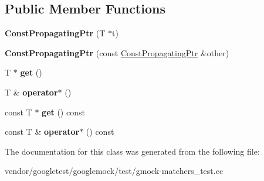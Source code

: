 \subsection*{Public Member Functions}
\begin{DoxyCompactItemize}
\item 
\mbox{\label{classtesting_1_1gmock__matchers__test_1_1_const_propagating_ptr_a06da70663daa274fb8ca3352f039d609}} 
{\bfseries Const\+Propagating\+Ptr} (T $\ast$t)
\item 
\mbox{\label{classtesting_1_1gmock__matchers__test_1_1_const_propagating_ptr_ae7620c62ba340603968896d5d5400ed1}} 
{\bfseries Const\+Propagating\+Ptr} (const \mbox{\hyperlink{classtesting_1_1gmock__matchers__test_1_1_const_propagating_ptr}{Const\+Propagating\+Ptr}} \&other)
\item 
\mbox{\label{classtesting_1_1gmock__matchers__test_1_1_const_propagating_ptr_a39a09d46453380ec1b8be8ce40adc453}} 
T $\ast$ {\bfseries get} ()
\item 
\mbox{\label{classtesting_1_1gmock__matchers__test_1_1_const_propagating_ptr_ad77bbeaa18f84cbd6f3dc7021904f1e3}} 
T \& {\bfseries operator$\ast$} ()
\item 
\mbox{\label{classtesting_1_1gmock__matchers__test_1_1_const_propagating_ptr_a92d7c8429246ef33a020e8a3d840b9c3}} 
const T $\ast$ {\bfseries get} () const
\item 
\mbox{\label{classtesting_1_1gmock__matchers__test_1_1_const_propagating_ptr_aad99a528754294ab397378034686ae3a}} 
const T \& {\bfseries operator$\ast$} () const
\end{DoxyCompactItemize}


The documentation for this class was generated from the following file\+:\begin{DoxyCompactItemize}
\item 
vendor/googletest/googlemock/test/gmock-\/matchers\+\_\+test.\+cc\end{DoxyCompactItemize}
